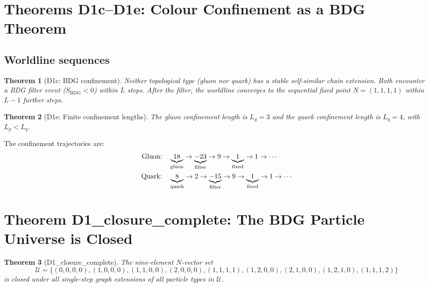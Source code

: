 \documentclass[11pt,a4paper]{article}
\newtheorem{theorem}{Theorem}[section]
\newcommand{\SBDG}{S_{\mathrm{BDG}}}
\begin{document}
\section{Theorems D1c--D1e: Colour Confinement as a BDG Theorem}

\subsection{Worldline sequences}

\begin{theorem}[D1c: BDG confinement]
\label{thm:D1c}
Neither topological type (gluon nor quark) has a stable self-similar chain extension.
Both encounter a BDG filter event ($\SBDG<0$) within $L$ steps.  After the filter,
the worldline converges to the sequential fixed point $N=(1,1,1,1)$ within $L-1$ further steps.
\end{theorem}

\begin{theorem}[D1e: Finite confinement lengths]
\label{thm:D1e}
The gluon confinement length is $L_g=3$ and the quark confinement length is $L_q=4$, with $L_g<L_q$.
\end{theorem}

The confinement trajectories are:
\begin{align*}
\text{Gluon:}\quad & \underbrace{18}_{\rm gluon} \to \underbrace{-23}_{\rm filter} \to 9 \to \underbrace{1}_{\rm fixed} \to 1 \to \cdots\\
\text{Quark:}\quad & \underbrace{8}_{\rm quark} \to 2 \to \underbrace{-15}_{\rm filter} \to 9 \to \underbrace{1}_{\rm fixed} \to 1 \to \cdots
\end{align*}

\section{Theorem D1\_closure\_complete: The BDG Particle Universe is Closed}

\begin{theorem}[D1\_closure\_complete]
\label{thm:closure}
The nine-element $N$-vector set
\[
\mathcal{U} = \{(0,0,0,0),(1,0,0,0),(1,1,0,0),(2,0,0,0),(1,1,1,1),(1,2,0,0),(2,1,0,0),(1,2,1,0),(1,1,1,2)\}
\]
is closed under all single-step graph extensions of all particle types in $\mathcal{U}$.
\end{theorem}
\end{document}
